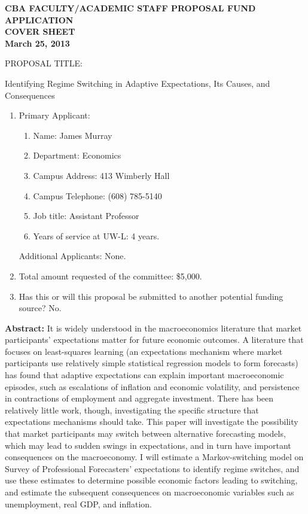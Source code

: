 \documentclass[12pt]{article}
\newcommand{\be}{\begin{enumerate}\setlength{\leftmargin}{0pt}}
\newcommand{\ee}{\end{enumerate}}
\begin{document}
\thispagestyle{empty}
\begin{center}
\textbf{CBA FACULTY/ACADEMIC STAFF PROPOSAL FUND APPLICATION}\\
\textbf{COVER SHEET}\\
\textbf{March 25, 2013}\\
\end{center}

PROPOSAL TITLE: \begin{center}Identifying Regime Switching in Adaptive Expectations, Its Causes, and Consequences\end{center}

\be
\item Primary Applicant:
  \be
  \item Name: James Murray
  \item Department: Economics
  \item Campus Address: 413 Wimberly Hall
  \item Campus Telephone: (608) 785-5140
  \item Job title: Assistant Professor
  \item Years of service at UW-L: 4 years.
  \ee
  Additional Applicants: None.
\item Total amount requested of the committee: \$5,000.
\item Has this or will this proposal be submitted to another potential funding source? No.
\ee
  
\newpage
\noindent \textbf{Abstract:} It is widely understood in the macroeconomics literature that market participants' expectations matter for future economic outcomes.  A literature that focuses on least-squares learning (an expectations mechanism where market participants use relatively simple statistical regression models to form forecasts) has found that adaptive expectations can explain important macroeconomic episodes, such as escalations of inflation and economic volatility, and persistence in contractions of employment and aggregate investment.  There has been relatively little work, though, investigating the specific structure that expectations mechanisms should take.  This paper will investigate the possibility that market participants may switch between alternative forecasting models, which may lead to sudden swings in expectations, and in turn have important consequences on the macroeconomy.  I will estimate a Markov-switching model on Survey of Professional Forecasters' expectations to identify regime switches, and use these estimates to determine possible economic factors leading to switching, and estimate the subsequent consequences on macroeconomic variables such as unemployment, real GDP, and inflation.
\end{document}
